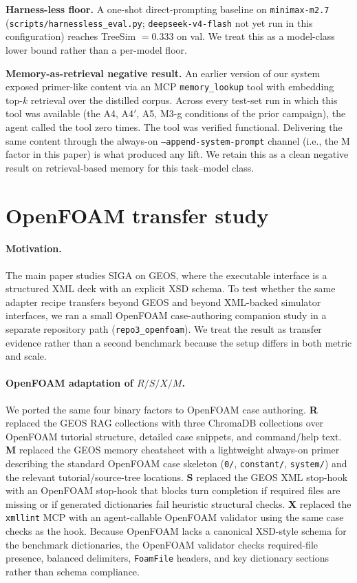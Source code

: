 \documentclass{article}
\begin{document}
\textbf{Harness-less floor.} A one-shot direct-prompting baseline on \texttt{minimax-m2.7} (\texttt{scripts/harnessless\_eval.py}; \texttt{deepseek-v4-flash} not yet run in this configuration) reaches TreeSim $= 0.333$ on val. We treat this as a model-class lower bound rather than a per-model floor.

\textbf{Memory-as-retrieval negative result.} An earlier version of our system exposed primer-like content via an MCP \texttt{memory\_lookup} tool with embedding top-$k$ retrieval over the distilled corpus. Across every test-set run in which this tool was available (the A4, A4$'$, A5, M3-g conditions of the prior campaign), the agent called the tool zero times. The tool was verified functional. Delivering the same content through the always-on \texttt{--append-system-prompt} channel (i.e., the M factor in this paper) is what produced any lift. We retain this as a clean negative result on retrieval-based memory for this task--model class.

\section{OpenFOAM transfer study}
\label{app:openfoam-transfer}

\paragraph{Motivation.}
The main paper studies SIGA on GEOS, where the executable interface is a structured XML deck with an explicit XSD schema. To test whether the same adapter recipe transfers beyond GEOS and beyond XML-backed simulator interfaces, we ran a small OpenFOAM case-authoring companion study in a separate repository path (\texttt{repo3\_openfoam}). We treat the result as transfer evidence rather than a second benchmark because the setup differs in both metric and scale.

\paragraph{OpenFOAM adaptation of \texorpdfstring{$R/S/X/M$}{R/S/X/M}.}
We ported the same four binary factors to OpenFOAM case authoring. \textbf{R} replaced the GEOS RAG collections with three ChromaDB collections over OpenFOAM tutorial structure, detailed case snippets, and command/help text. \textbf{M} replaced the GEOS memory cheatsheet with a lightweight always-on primer describing the standard OpenFOAM case skeleton (\texttt{0/}, \texttt{constant/}, \texttt{system/}) and the relevant tutorial/source-tree locations. \textbf{S} replaced the GEOS XML stop-hook with an OpenFOAM stop-hook that blocks turn completion if required files are missing or if generated dictionaries fail heuristic structural checks. \textbf{X} replaced the \texttt{xmllint} MCP with an agent-callable OpenFOAM validator using the same case checks as the hook. Because OpenFOAM lacks a canonical XSD-style schema for the benchmark dictionaries, the OpenFOAM validator checks required-file presence, balanced delimiters, \texttt{FoamFile} headers, and key dictionary sections rather than schema compliance.
\end{document}
